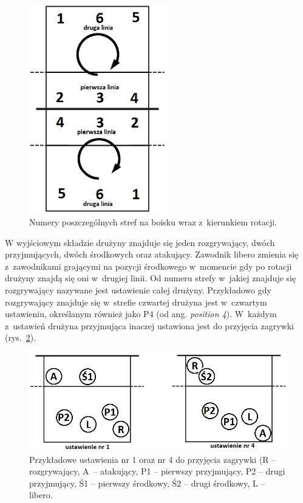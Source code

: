 \documentclass[a4paper,twoside,12pt]{book}
\newcommand{\obcy}[1]{\emph{#1}}
\renewcommand{\ang}[1]{{\selectlanguage{british}\obcy{#1}}}
\begin{document}
\begin{figure}[t]
\includegraphics[width=6cm]{strefy}
\centering
\caption{Numery poszczególnych stref na boisku wraz z~kierunkiem rotacji.}
\label{fig:strefy}
\end{figure}

W wyjściowym składzie drużyny znajduje się jeden rozgrywający, dwóch przyjmujących, dwóch środkowych oraz atakujący. Zawodnik libero zmienia się z~zawodnikami grającymi na pozycji środkowego w~momencie gdy po rotacji drużyny znajdą się oni w~drugiej linii. Od numeru strefy w~jakiej znajduje się rozgrywający nazywane jest ustawienie całej drużyny. Przykładowo gdy rozgrywający znajduje się w~strefie czwartej drużyna jest w~czwartym ustawieniu, określanym również jako P4 (od ang. \ang{position 4}). W~każdym z~ustawień drużyna przyjmująca inaczej ustawiona jest do przyjęcia zagrywki (rys.~\ref{fig:ustawienia}). 
\begin{figure}[t]
\includegraphics[width=\textwidth]{ustawienia}
\centering
\caption{Przykładowe ustawienia nr 1 oraz nr 4 do przyjęcia zagrywki (R -- rozgrywający, A~-- atakujący, P1 -- pierwszy przyjmujący, P2 -- drugi przyjmujący, Ś1 -- pierwszy środkowy, Ś2 -- drugi środkowy, L -- libero.}
\label{fig:ustawienia}
\end{figure} 
\end{document}
